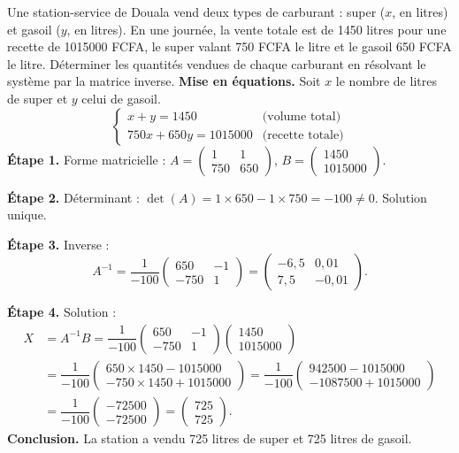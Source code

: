 \documentclass[11pt]{article}
\begin{document}
\begin{exoresolu}
Une station-service de Douala vend deux types de carburant : super ($x$, en litres) et gasoil ($y$, en litres). En une journée, la vente totale est de 1450 litres pour une recette de \num{1015000} FCFA, le super valant 750 FCFA le litre et le gasoil 650 FCFA le litre. Déterminer les quantités vendues de chaque carburant en résolvant le système par la matrice inverse.
\tcblower
\textbf{Mise en équations.} Soit $x$ le nombre de litres de super et $y$ celui de gasoil.
\[
\begin{cases} x + y = 1450 & \text{(volume total)} \\ 750x + 650y = \num{1015000} & \text{(recette totale)} \end{cases}
\]
\textbf{Étape 1.} Forme matricielle : $A = \begin{pmatrix} 1 & 1 \\ 750 & 650 \end{pmatrix}$, $B = \begin{pmatrix} 1450 \\ \num{1015000} \end{pmatrix}$.

\textbf{Étape 2.} Déterminant : $\det(A) = 1 \times 650 - 1 \times 750 = -100 \neq 0$. Solution unique.

\textbf{Étape 3.} Inverse :
\[
A^{-1} = \dfrac{1}{-100}\begin{pmatrix} 650 & -1 \\ -750 & 1 \end{pmatrix} = \begin{pmatrix} -6{,}5 & 0{,}01 \\ 7{,}5 & -0{,}01 \end{pmatrix}.
\]

\textbf{Étape 4.} Solution :
\begin{align*}
X &= A^{-1}B = \dfrac{1}{-100}\begin{pmatrix} 650 & -1 \\ -750 & 1 \end{pmatrix}\begin{pmatrix} 1450 \\ \num{1015000} \end{pmatrix}\\
&= \dfrac{1}{-100}\begin{pmatrix} 650 \times 1450 - \num{1015000} \\ -750 \times 1450 + \num{1015000} \end{pmatrix}
= \dfrac{1}{-100}\begin{pmatrix} 942500 - \num{1015000} \\ -\num{1087500} + \num{1015000} \end{pmatrix}\\
&= \dfrac{1}{-100}\begin{pmatrix} -72500 \\ -72500 \end{pmatrix} = \begin{pmatrix} 725 \\ 725 \end{pmatrix}.
\end{align*}
\textbf{Conclusion.} La station a vendu 725 litres de super et 725 litres de gasoil.


\end{exoresolu}
\end{document}
